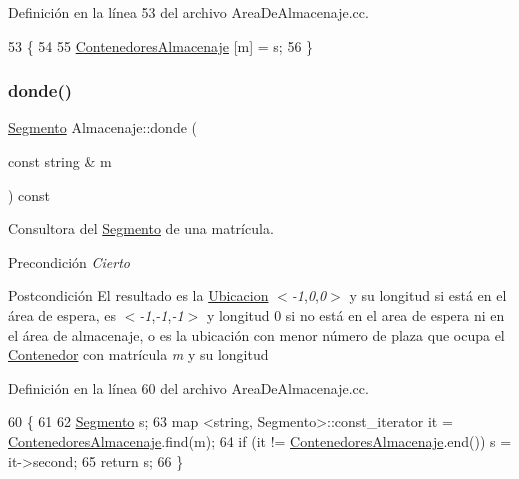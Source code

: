 Definición en la línea 53 del archivo Area\+De\+Almacenaje.\+cc.


\begin{DoxyCode}
53                                                                          \{
54     
55     \hyperlink{class_almacenaje_ab3cfe0feaf244094a7e2c5225ee681e6}{ContenedoresAlmacenaje} [m] = s;
56 \}
\end{DoxyCode}
\mbox{\label{class_almacenaje_afe08e4bca255d4baf3750019622e6cb2}} 
\subsubsection{\texorpdfstring{donde()}{donde()}}
{\footnotesize\ttfamily \hyperlink{class_segmento}{Segmento} Almacenaje\+::donde (\begin{DoxyParamCaption}\item[{const string \&}]{m }\end{DoxyParamCaption}) const}



Consultora del \hyperlink{class_segmento}{Segmento} de una matrícula. 

\begin{DoxyPrecond}{Precondición}
{\itshape Cierto} 
\end{DoxyPrecond}
\begin{DoxyPostcond}{Postcondición}
El resultado es la \hyperlink{class_ubicacion}{Ubicacion} $<${\itshape -\/1},{\itshape 0},{\itshape 0}$>$ y su longitud si está en el área de espera, es $<${\itshape -\/1},{\itshape -\/1},{\itshape -\/1}$>$ y longitud 0 si no está en el area de espera ni en el área de almacenaje, o es la ubicación con menor número de plaza que ocupa el \hyperlink{class_contenedor}{Contenedor} con matrícula {\itshape m} y su longitud 
\end{DoxyPostcond}


Definición en la línea 60 del archivo Area\+De\+Almacenaje.\+cc.


\begin{DoxyCode}
60                                                  \{
61     
62     \hyperlink{class_segmento}{Segmento} s;
63     map <string, Segmento>::const\_iterator it = \hyperlink{class_almacenaje_ab3cfe0feaf244094a7e2c5225ee681e6}{ContenedoresAlmacenaje}.find(m);
64     \textcolor{keywordflow}{if} (it != \hyperlink{class_almacenaje_ab3cfe0feaf244094a7e2c5225ee681e6}{ContenedoresAlmacenaje}.end()) s = it->second;
65     \textcolor{keywordflow}{return} s;
66 \}
\end{DoxyCode}
\mbox{\label{class_almacenaje_a745cf4e181058d391aed220843d6cede}} 
